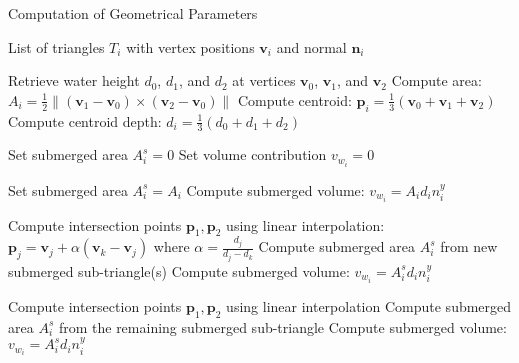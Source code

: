 \begin{algorithm}
\caption{Computation of Geometrical Parameters}
\label{alg:geom_params}
\begin{algorithmic}[1]
\Require List of triangles $T_i$ with vertex positions $\mathbf{v}_i$ and normal $\mathbf{n}_i$

    \State Retrieve water height $d_0$, $d_1$, and $d_2$ at vertices $\mathbf{v}_0$, $\mathbf{v}_1$, and $\mathbf{v}_2$
    \State Compute area: $A_i = \frac{1}{2} \|(\mathbf{v}_1 - \mathbf{v}_0) \times (\mathbf{v}_2 - \mathbf{v}_0)\|$
    \State Compute centroid: $\mathbf{p}_i = \frac{1}{3} (\mathbf{v}_0 + \mathbf{v}_1 + \mathbf{v}_2)$
    \State Compute centroid depth: $d_i = \frac{1}{3} (d_0 + d_1 + d_2)$
    
      
        \State Set submerged area $A_i^s = 0$
        \State Set volume contribution $v_{w_i} = 0$
        
     
        \State Set submerged area $A_i^s = A_i$
        \State Compute submerged volume: $v_{w_i} = A_i d_i n_i^y$
        
     
        \State Compute intersection points $\mathbf{p}_1, \mathbf{p}_2$ using linear interpolation:
        \State $\mathbf{p}_j = \mathbf{v}_j + \alpha (\mathbf{v}_k - \mathbf{v}_j)$ where $\alpha = \frac{d_j}{d_j - d_k}$
        \State Compute submerged area $A_i^s$ from new submerged sub-triangle(s)
        \State Compute submerged volume: $v_{w_i} = A_i^s d_i n_i^y$
        
     
        \State Compute intersection points $\mathbf{p}_1, \mathbf{p}_2$ using linear interpolation
        \State Compute submerged area $A_i^s$ from the remaining submerged sub-triangle
        \State Compute submerged volume: $v_{w_i} = A_i^s d_i n_i^y$
    \EndIf
\EndFor

\end{algorithmic}
\end{algorithm}
